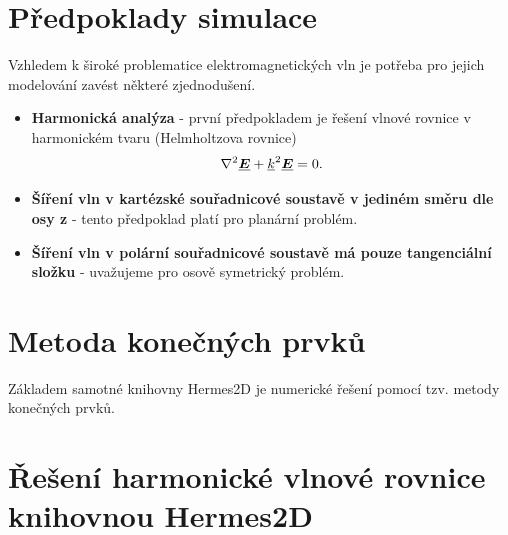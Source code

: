 \section{Předpoklady simulace}
Vzhledem k široké problematice elektromagnetických vln je potřeba pro jejich modelování zavést některé zjednodušení. 
\begin{itemize}
\item {\bf Harmonická analýza} - první předpokladem je řešení vlnové rovnice v harmonickém tvaru (Helmholtzova rovnice)
\begin{displaymath}
	\nabla^{2}\mbox{\underline{\boldmath$E$}} +{\underline{k}}^{2}\mbox{\underline{\boldmath$E$}} = 0.
\end{displaymath}
\item {\bf Šíření vln v kartézské souřadnicové soustavě v jediném směru dle osy z} - tento předpoklad platí pro planární problém.
\item {\bf Šíření vln v polární souřadnicové soustavě má pouze tangenciální složku} - uvažujeme pro osově symetrický problém.
\end{itemize}

\section{Metoda konečných prvků}
Základem samotné knihovny Hermes2D je numerické řešení pomocí tzv. metody konečných prvků.

\section{Řešení harmonické vlnové rovnice knihovnou Hermes2D}
